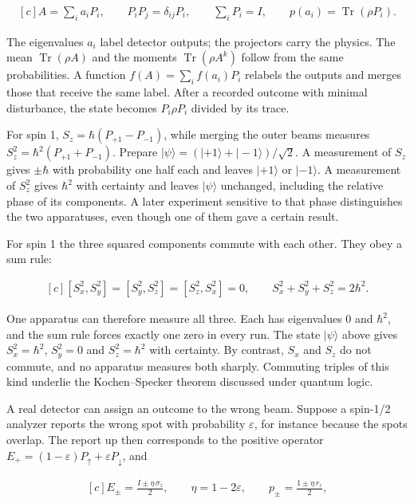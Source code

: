 \documentclass[11pt,oneside]{book}
\newenvironment{centeredalign}{\[\begin{gathered}[c]}{\end{gathered}\]}
\begin{document}
\begin{centeredalign}
A=\sum_ia_iP_i,\qquad P_iP_j=\delta_{ij}P_i,\qquad \sum_iP_i=I,\qquad
p(a_i)=\operatorname{Tr}(\rho P_i).
\end{centeredalign}

The eigenvalues \(a_i\) label detector outputs; the projectors carry the physics. The mean \(\operatorname{Tr}(\rho A)\) and the moments \(\operatorname{Tr}(\rho A^k)\) follow from the same probabilities. A function \(f(A)=\sum_if(a_i)P_i\) relabels the outputs and merges those that receive the same label. After a recorded outcome with minimal disturbance, the state becomes \(P_i\rho P_i\) divided by its trace.

For spin 1, \(S_z=\hbar(P_{+1}-P_{-1})\), while merging the outer beams measures \(S_z^2=\hbar^2(P_{+1}+P_{-1})\). Prepare \(|\psi\rangle=(|{+}1\rangle+|{-}1\rangle)/\sqrt2\). A measurement of \(S_z\) gives \(\pm\hbar\) with probability one half each and leaves \(|{+}1\rangle\) or \(|{-}1\rangle\). A measurement of \(S_z^2\) gives \(\hbar^2\) with certainty and leaves \(|\psi\rangle\) unchanged, including the relative phase of its components. A later experiment sensitive to that phase distinguishes the two apparatuses, even though one of them gave a certain result.

For spin 1 the three squared components commute with each other. They obey a sum rule:

\begin{centeredalign}
[S_x^2,S_y^2]=[S_y^2,S_z^2]=[S_z^2,S_x^2]=0,\qquad
S_x^2+S_y^2+S_z^2=2\hbar^2.
\end{centeredalign}

One apparatus can therefore measure all three. Each has eigenvalues \(0\) and \(\hbar^2\), and the sum rule forces exactly one zero in every run. The state \(|\psi\rangle\) above gives \(S_x^2=\hbar^2\), \(S_y^2=0\) and \(S_z^2=\hbar^2\) with certainty. By contrast, \(S_x\) and \(S_z\) do not commute, and no apparatus measures both sharply. Commuting triples of this kind underlie the Kochen--Specker theorem discussed under quantum logic.

A real detector can assign an outcome to the wrong beam. Suppose a spin-1/2 analyzer reports the wrong spot with probability \(\varepsilon\), for instance because the spots overlap. The report up then corresponds to the positive operator \(E_+=(1-\varepsilon)P_\uparrow+\varepsilon P_\downarrow\), and

\begin{centeredalign}
E_\pm=\frac{I\pm\eta\,\sigma_z}{2},\qquad \eta=1-2\varepsilon,\qquad
p_\pm=\frac{1\pm\eta\,r_z}{2},
\end{centeredalign}
\end{document}
